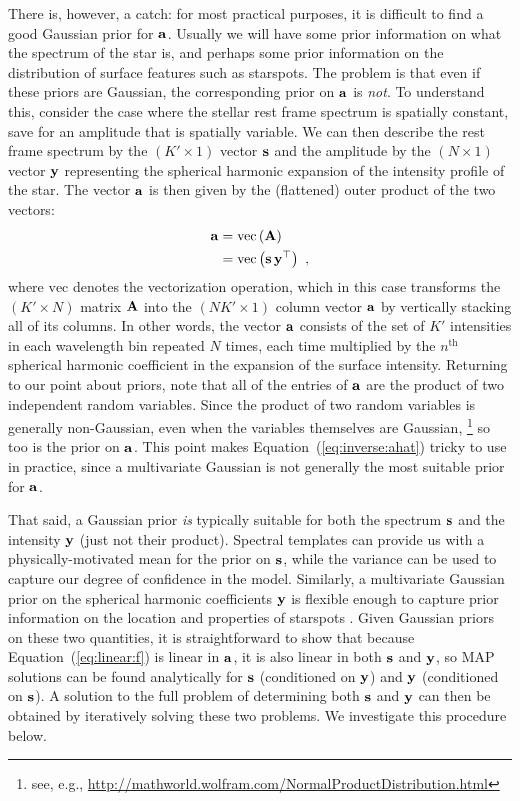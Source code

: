 \documentclass[modern]{aastex631}
\begin{document}
There is, however, a catch: for most practical purposes, it is difficult to find a good Gaussian prior for ${\mathbf{a}}$. 
Usually we will have some prior information on what the spectrum of the star is, and perhaps some prior information on the distribution of surface features such as starspots. 
The problem is that even if these priors are Gaussian, the corresponding prior on ${\mathbf{a}}$ is \emph{not}. 
To understand this, consider the case where the stellar rest frame spectrum is spatially constant, save for an amplitude that is spatially variable. 
We can then describe the rest frame spectrum by the $(K' \times 1)$ vector ${\mathbf{s}}$ and the amplitude by the $(N \times 1)$ vector ${\mathbf{y}}$ representing the spherical harmonic expansion of the intensity profile of the star. 
The vector ${\mathbf{a}}$ is then given by the (flattened) outer product of the two vectors:
%
\begin{align}
    \label{eq:inverse:alm}
    {\ensuremath{\mathbf{a}}} & = \mathrm{vec}\left( {\mathbf{A}} \right) \nonumber             \\
           & = \mathrm{vec}\left( {\mathbf{s}} \, {\mathbf{y}}^\top \right) \hskip 0.33em,
\end{align}
%
where $\mathrm{vec}$ denotes the vectorization operation, which in this case transforms the $(K' \times N)$ matrix ${\mathbf{A}}$ into the $(N K' \times 1)$ column vector ${\mathbf{a}}$ by vertically stacking all of its columns. 
In other words, the vector ${\mathbf{a}}$ consists of the set of $K'$ intensities in each wavelength bin repeated $N$ times, each time multiplied by the $n^\mathrm{th}$ spherical harmonic coefficient in the expansion of the surface intensity. 
Returning to our point about priors, note that all of the entries of ${\mathbf{a}}$ are the product of two independent random variables. 
Since the product of two random variables is generally non-Gaussian, even when the variables themselves are Gaussian,%
\footnote{see, e.g., \url{http://mathworld.wolfram.com/NormalProductDistribution.html}}%
so too is the prior on ${\mathbf{a}}$. 
This point makes Equation~(\ref{eq:inverse:ahat}) tricky to use in practice, since a multivariate Gaussian is not generally the most suitable prior for ${\mathbf{a}}$.

That said, a Gaussian prior \emph{is} typically suitable for both the spectrum ${\mathbf{s}}$ and the intensity ${\mathbf{y}}$ (just not their product). 
Spectral templates can provide us with a physically-motivated mean for the prior on ${\mathbf{s}}$, while the variance can be used to capture our degree of confidence in the model.
Similarly, a multivariate Gaussian prior on the spherical harmonic coefficients ${\mathbf{y}}$ is flexible enough to capture prior information on the location and properties of starspots \citep{Luger2021b}.
%
Given Gaussian priors on these two quantities, it is straightforward to show that because Equation~(\ref{eq:linear:f}) is linear in ${\mathbf{a}}$, it is also linear in both ${\mathbf{s}}$ and ${\mathbf{y}}$, so MAP solutions can be found analytically for ${\mathbf{s}}$ (conditioned on ${\mathbf{y}}$) and ${\mathbf{y}}$ (conditioned on ${\mathbf{s}}$).
A solution to the full problem of determining both ${\mathbf{s}}$ and ${\mathbf{y}}$ can then be obtained by iteratively solving these two problems.
We investigate this procedure below.
\end{document}
